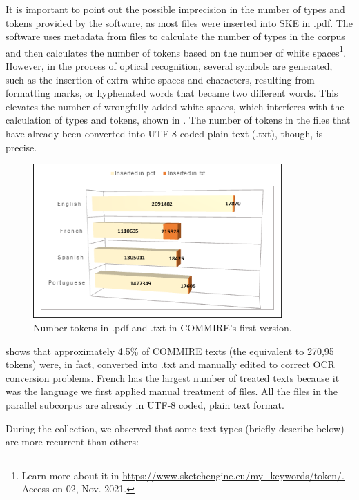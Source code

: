 \documentclass[english]{textolivre}
\begin{document}
It is important to point out the possible imprecision in the number of types and tokens provided by the software, as most files were inserted into SKE in .pdf. The software uses metadata from files to calculate the number of types in the corpus and then calculates the number of tokens based on the number of white spaces\footnote{Learn more about it in \url{https://www.sketchengine.eu/my_keywords/token/.} Access on 02, Nov. 2021.}. However, in the process of optical recognition, several symbols are generated, such as the insertion of extra white spaces and characters, resulting from formatting marks, or hyphenated words that became two different words. This elevates the number of wrongfully added white spaces, which interferes with the calculation of types and tokens, shown in . The number of tokens in the files that have already been converted into UTF-8 coded plain text (.txt), though, is precise.

\begin{figure}[htbp]
\centering
\includegraphics[width=0.85\textwidth]{Figura04.png}
\caption{Number tokens in .pdf and .txt in COMMIRE's first version.}
\label{Figura04}
\end{figure}

 shows that approximately 4.5\% of COMMIRE texts (the equivalent to 270,95 tokens) were, in fact, converted into .txt and manually edited to correct OCR conversion problems. French has the largest number of treated texts because it was the language we first applied manual treatment of files. All the files in the parallel subcorpus are already in UTF-8 coded, plain text format.

During the collection, we observed that some text types (briefly describe below) are more recurrent than others:
\end{document}
